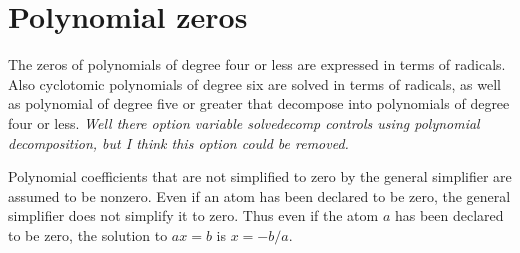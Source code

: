 \documentclass[]{scrartcl}
\begin{document}
\section{Polynomial zeros}

The zeros of polynomials of degree four or less are expressed in terms of radicals. Also  cyclotomic polynomials of degree six are solved in terms of radicals, as well as polynomial of degree five or greater that decompose into polynomials of degree four or less. \emph{Well there option variable solvedecomp controls using polynomial decomposition, but I think this option could be removed.}

\begin{alphalist}[noitemsep]

\item  Polynomial coefficients that are not simplified to zero by the  general simplifier are assumed to be nonzero. Even if an atom has been declared to be zero, the general simplifier does not simplify  it to zero. Thus even if the atom \(a\) has been declared to be zero, the solution to \(a x = b\) is \(x = -b/a \).



\end{alphalist}
\end{document}
